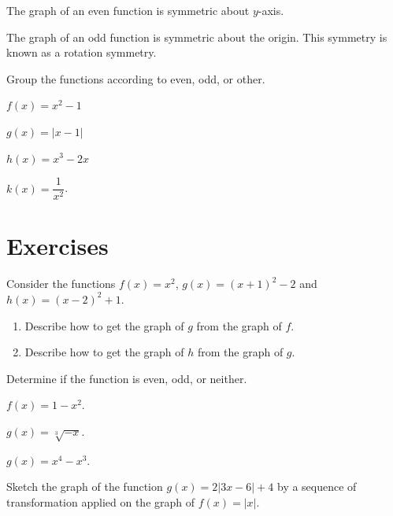 \begin{remark}
  The graph of an even function is symmetric about $y$-axis.

  The graph of an odd function is symmetric about the origin. This symmetry is known as a rotation symmetry.
\end{remark}

\begin{example}
  Group the functions according to even, odd, or other.\\
  \begin{enumerate*}
    \item $f(x)=x^2-1$
    \item $g(x)=|x-1|$
    \item $h(x)=x^3-2x$
    \item $k(x)=\dfrac{1}{x^2}$.
  \end{enumerate*}
\end{example}


\newpage

\section*{Exercises}

\begin{exercise}
    Consider the functions $f(x)=x^2$, $g(x)=(x+1)^2-2$ and $h(x)=(x-2)^2+1$.
    \begin{enumerate}
      \item Describe how to get the graph of $g$ from the graph of $f$.
      \item Describe how to get the graph of $h$ from the graph of $g$.
    \end{enumerate}
\end{exercise}

\begin{exercise}
    Determine if the function is even, odd, or neither.\\
    \begin{enumerate*}
      \item $f(x)=1-x^2$.
      \item $g(x)=\sqrt[3]{-x}$.
      \item $g(x)=x^4-x^3$.
      \hfill\mbox{}
    \end{enumerate*}  
\end{exercise}

\newpage

\begin{exercise}
  Sketch the graph of the function $g(x)=2|3x-6| + 4$ by a sequence of transformation applied on the graph of $f(x)=|x|$.  
\end{exercise}

